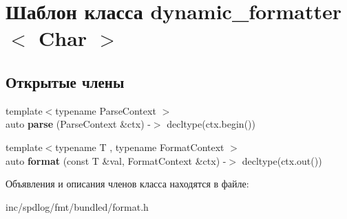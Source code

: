 \hypertarget{classdynamic__formatter}{}\section{Шаблон класса dynamic\+\_\+formatter$<$ Char $>$}
\label{classdynamic__formatter}
\subsection*{Открытые члены}
\begin{DoxyCompactItemize}
\item 
\mbox{\label{classdynamic__formatter_aa9bc96ae30462d4e5f13d207f957fc0b}} 
{\footnotesize template$<$typename Parse\+Context $>$ }\\auto {\bfseries parse} (Parse\+Context \&ctx) -\/$>$ decltype(ctx.\+begin())
\item 
\mbox{\label{classdynamic__formatter_ad409c112b5d8058d65e3b96d20c4a524}} 
{\footnotesize template$<$typename T , typename Format\+Context $>$ }\\auto {\bfseries format} (const T \&val, Format\+Context \&ctx) -\/$>$ decltype(ctx.\+out())
\end{DoxyCompactItemize}


Объявления и описания членов класса находятся в файле\+:\begin{DoxyCompactItemize}
\item 
inc/spdlog/fmt/bundled/format.\+h\end{DoxyCompactItemize}
